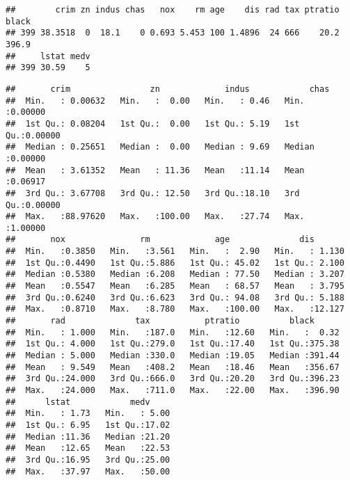 \documentclass[]{article}
\newenvironment{Shaded}{\begin{snugshade}}{\end{snugshade}}
\newcommand{\CommentTok}[1]{\textcolor[rgb]{0.56,0.35,0.01}{\textit{#1}}}
\newcommand{\KeywordTok}[1]{\textcolor[rgb]{0.13,0.29,0.53}{\textbf{#1}}}
\newcommand{\NormalTok}[1]{#1}
\begin{document}
\begin{verbatim}
##        crim zn indus chas   nox    rm age    dis rad tax ptratio black
## 399 38.3518  0  18.1    0 0.693 5.453 100 1.4896  24 666    20.2 396.9
##     lstat medv
## 399 30.59    5
\end{verbatim}

\begin{Shaded}
\end{Shaded}

\begin{verbatim}
##       crim                zn             indus            chas        
##  Min.   : 0.00632   Min.   :  0.00   Min.   : 0.46   Min.   :0.00000  
##  1st Qu.: 0.08204   1st Qu.:  0.00   1st Qu.: 5.19   1st Qu.:0.00000  
##  Median : 0.25651   Median :  0.00   Median : 9.69   Median :0.00000  
##  Mean   : 3.61352   Mean   : 11.36   Mean   :11.14   Mean   :0.06917  
##  3rd Qu.: 3.67708   3rd Qu.: 12.50   3rd Qu.:18.10   3rd Qu.:0.00000  
##  Max.   :88.97620   Max.   :100.00   Max.   :27.74   Max.   :1.00000  
##       nox               rm             age              dis        
##  Min.   :0.3850   Min.   :3.561   Min.   :  2.90   Min.   : 1.130  
##  1st Qu.:0.4490   1st Qu.:5.886   1st Qu.: 45.02   1st Qu.: 2.100  
##  Median :0.5380   Median :6.208   Median : 77.50   Median : 3.207  
##  Mean   :0.5547   Mean   :6.285   Mean   : 68.57   Mean   : 3.795  
##  3rd Qu.:0.6240   3rd Qu.:6.623   3rd Qu.: 94.08   3rd Qu.: 5.188  
##  Max.   :0.8710   Max.   :8.780   Max.   :100.00   Max.   :12.127  
##       rad              tax           ptratio          black       
##  Min.   : 1.000   Min.   :187.0   Min.   :12.60   Min.   :  0.32  
##  1st Qu.: 4.000   1st Qu.:279.0   1st Qu.:17.40   1st Qu.:375.38  
##  Median : 5.000   Median :330.0   Median :19.05   Median :391.44  
##  Mean   : 9.549   Mean   :408.2   Mean   :18.46   Mean   :356.67  
##  3rd Qu.:24.000   3rd Qu.:666.0   3rd Qu.:20.20   3rd Qu.:396.23  
##  Max.   :24.000   Max.   :711.0   Max.   :22.00   Max.   :396.90  
##      lstat            medv      
##  Min.   : 1.73   Min.   : 5.00  
##  1st Qu.: 6.95   1st Qu.:17.02  
##  Median :11.36   Median :21.20  
##  Mean   :12.65   Mean   :22.53  
##  3rd Qu.:16.95   3rd Qu.:25.00  
##  Max.   :37.97   Max.   :50.00
\end{verbatim}
\end{document}
